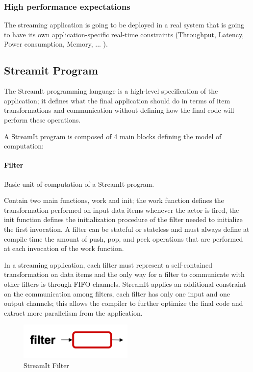 \documentclass[../main.tex]{subfiles}
\begin{document}
\subsubsection{High performance expectations}
The streaming application is going to be deployed in a real system that is going to have its own application-specific real-time constraints (Throughput, Latency, Power consumption, Memory, ... ). 

\subsection{Streamit Program}

The StreamIt programming language is a high-level specification of the application; it defines what the final application should do in terms of item transformations and communication without defining how the final code will perform these operations.

A StreamIt program is composed of 4 main blocks defining the model of computation:

\paragraph{Filter}
Basic unit of computation of a StreamIt program.

Contain two main functions, work and init; the work function defines the transformation performed on input data items whenever the actor is fired, the init function defines the initialization procedure of the filter needed to initialize the first invocation. A filter can be stateful or stateless and must always define at compile time the amount of push, pop, and peek operations that are performed at each invocation of the work function.

\newpage
In a streaming application, each filter must represent a self-contained transformation on data items and the only way for a filter to communicate with other filters is through FIFO channels. StreamIt applies an additional constraint on the communication among filters, each filter has only one input and one output channels; this allows the compiler to further optimize the final code and extract more parallelism from the application.


\begin{figure}[h!]
  \includegraphics[width=0.5\textwidth]{images/StreamItFilter.png}
  \centering
  \caption{StreamIt Filter}
  \label{fig:filter}
\end{figure}
\end{document}
